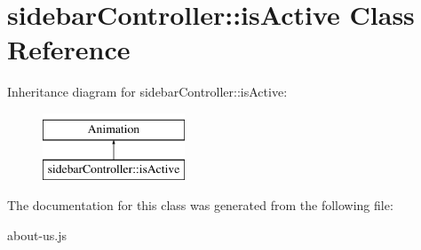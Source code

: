 \hypertarget{classsidebarController_1_1isActive}{\section{sidebar\-Controller\-:\-:is\-Active Class Reference}
\label{classsidebarController_1_1isActive}
}
Inheritance diagram for sidebar\-Controller\-:\-:is\-Active\-:\begin{figure}[H]
\begin{center}
\leavevmode
\includegraphics[height=2.000000cm]{classsidebarController_1_1isActive}
\end{center}
\end{figure}


The documentation for this class was generated from the following file\-:\begin{DoxyCompactItemize}
\item 
about-\/us.\-js\end{DoxyCompactItemize}
